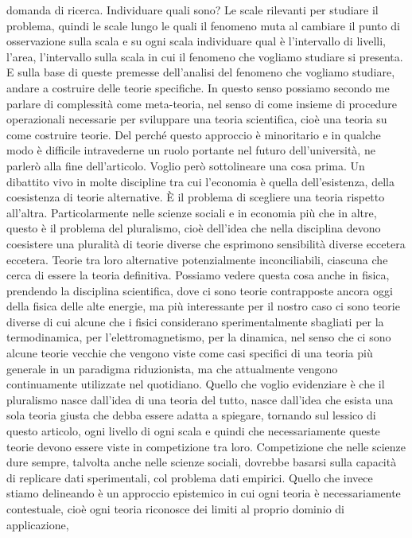 \documentclass[a4paper, headings=standardclasses]{scrartcl}
\begin{document}
domanda di ricerca. Individuare quali sono?
Le scale rilevanti per studiare il problema, quindi le scale lungo le quali il fenomeno muta
al cambiare il punto di osservazione sulla scala e su ogni scala individuare qual è l'intervallo
di livelli, l'area, l'intervallo sulla scala in cui il fenomeno che vogliamo studiare si
presenta. E sulla base di queste premesse dell'analisi del fenomeno che vogliamo studiare, andare
a costruire delle teorie specifiche. In questo senso possiamo secondo me parlare di complessità
come meta-teoria, nel senso di come insieme di procedure operazionali necessarie per sviluppare
una teoria scientifica, cioè una teoria su come costruire teorie.
Del perché questo approccio è minoritario e in qualche modo è difficile intravederne
un ruolo portante nel futuro dell'università, ne parlerò alla fine dell'articolo. Voglio però
sottolineare una cosa prima. Un dibattito vivo in molte discipline tra cui l'economia è quella
dell'esistenza, della coesistenza di teorie alternative. È il problema di scegliere una teoria rispetto
all'altra. Particolarmente nelle scienze sociali e in economia più che in altre, questo è il problema del pluralismo,
cioè dell'idea che nella disciplina devono coesistere una pluralità di teorie diverse che
esprimono sensibilità diverse eccetera eccetera. Teorie tra loro alternative potenzialmente
inconciliabili, ciascuna che cerca di essere la teoria definitiva. Possiamo vedere questa cosa
anche in fisica, prendendo la disciplina scientifica, dove ci sono teorie contrapposte ancora oggi
della fisica delle alte energie, ma più interessante per il nostro caso ci sono teorie diverse di
cui alcune che i fisici considerano sperimentalmente sbagliati per la termodinamica, per l'elettromagnetismo,
per la dinamica, nel senso che ci sono alcune teorie vecchie che vengono viste come casi specifici
di una teoria più generale in un paradigma riduzionista, ma che attualmente vengono
continuamente utilizzate nel quotidiano. Quello che voglio evidenziare è che il pluralismo nasce
dall'idea di una teoria del tutto, nasce dall'idea che esista una sola teoria giusta che debba essere
adatta a spiegare, tornando sul lessico di questo articolo, ogni livello di ogni scala e quindi che
necessariamente queste teorie devono essere viste in competizione tra loro. Competizione che nelle scienze dure
sempre, talvolta anche nelle scienze sociali, dovrebbe basarsi sulla capacità di replicare
dati sperimentali, col problema dati empirici. Quello che invece stiamo delineando è un approccio epistemico
in cui ogni teoria è necessariamente contestuale, cioè ogni teoria riconosce dei limiti al proprio dominio di applicazione,
\end{document}
